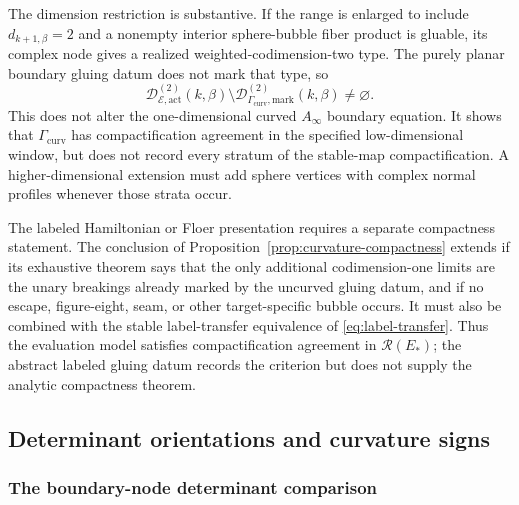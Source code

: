 \documentclass[11pt,letterpaper,twoside]{article}
\theoremstyle{plain}
\theoremstyle{definition}
\theoremstyle{remark}
\newcommand{\Ainf}{A_\infty}
\begin{document}
The dimension restriction is substantive.  If the range is enlarged to include $d_{k+1,\beta}=2$ and a nonempty interior sphere-bubble fiber product is gluable, its complex node gives a realized weighted-codimension-two type.  The purely planar boundary gluing datum does not mark that type, so
\begin{equation}\label{eq:sphere-bubble-compactness-defect}
 \mathcal D^{(2)}_{\mathcal E,\mathrm{act}}(k,\beta)
 \setminus\mathcal D^{(2)}_{\Gamma_{\mathrm{curv}},\mathrm{mark}}(k,\beta)
 \neq\varnothing.
\end{equation}
This does not alter the one-dimensional curved $\Ainf$ boundary equation.  It shows that \(\Gamma_{\mathrm{curv}}\) has compactification agreement in the specified low-dimensional window, but does not record every stratum of the stable-map compactification.  A higher-dimensional extension must add sphere vertices with complex normal profiles whenever those strata occur.

The labeled Hamiltonian or Floer presentation requires a separate compactness statement.  The conclusion of Proposition~\ref{prop:curvature-compactness} extends if its exhaustive theorem says that the only additional codimension-one limits are the unary breakings already marked by the uncurved gluing datum, and if no escape, figure-eight, seam, or other target-specific bubble occurs.  It must also be combined with the stable label-transfer equivalence of \eqref{eq:label-transfer}.  Thus the evaluation model satisfies compactification agreement in \(\mathcal R(E_*)\); the abstract labeled gluing datum records the criterion but does not supply the analytic compactness theorem.

\subsection{Determinant orientations and curvature signs}\label{sec:curved-orientation}

\subsubsection{The boundary-node determinant comparison}
\end{document}

